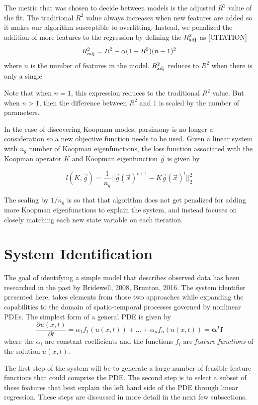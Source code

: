 \documentclass{article}
\begin{document}
The metric that was chosen to decide between models is the adjusted $R^2$ value of the fit. The traditional $R^2$ value always increases when new features are added so it makes our algorithm susceptible to overfitting. Instead, we penalized the addition of more features to the regression by defining the $R_{\rm adj}^2$ as [CITATION]
\[ R_{\rm adj}^2 = R^2 - \alpha (1-  R^2)(n-1)^2\]
where $n$ is the number of features in the model. $R_{\rm adj}^2$ reduces to $R^2$ when there is only a single

Note that when $n=1$, this expression reduces to the traditional $R^2$ value. But when $n>1$, then the difference between $R^2$ and 1 is scaled by the number of parameters.

In the case of discovering Koopman modes, parsimony is no longer a consideration so a new objective function needs to be used. Given a linear system with $n_g$ number of Koopman eigenfunctions, the loss function associated with the Koopman operator $K$ and Koopman eigenfunction $\vec{g}$ is given by

\[ l(K, \vec{g}) = \frac{1}{n_g}||\vec{g}(\vec{x})^{t+1} - K \vec{g}(\vec{x})^{t}||_2^2 \]

The scaling by $1/n_g$ is so that that algorithm does not get penalized for adding more Koopman eigenfunctions to explain the system, and instead focuses on closely matching each new state variable on each iteration.




\section{System Identification}
\label{systemidentification}

The goal of identifying a simple model that describes observed data has been researched in the past by Bridewell, 2008, Brunton, 2016. The system identifier presented here, takes elements from those two approaches while expanding the capabilities to the domain of spatio-temporal processes governed by nonlinear PDEs. The simplest form of a general PDE is given by
\[ \frac{\partial u(x,t)}{\partial t} = \alpha_1 f_1(u(x,t)) + ... + \alpha_n f_n(u(x,t)) = \bm{\alpha}^T \bm{f} \]
where the $\alpha_i$ are constant coefficients and the functions $f_i$ are \textit{feature functions} of the solution $u(x,t)$.

The first step of the system will be to generate a large number of feasible feature functions that could comprise the PDE. The second step is to select a subset of these features that best explain the left hand side of the PDE through linear regression. These steps are discussed in more detail in the next few subsections.
\end{document}
